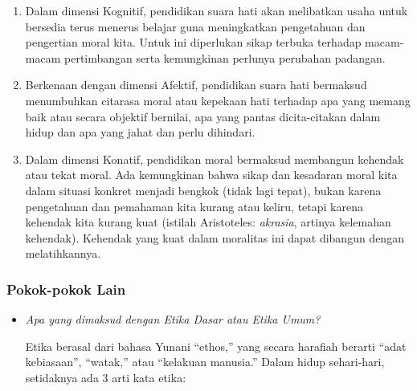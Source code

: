 \documentclass[10pt,a4paper]{article}
\def\tightlist{}
\begin{document}
\begin{multicols}{2}
\begin{enumerate}
\def\labelenumi{\arabic{enumi}.}
\tightlist
\item
  Dalam dimensi Kognitif, pendidikan suara hati akan melibatkan usaha
  untuk bersedia terus menerus belajar guna meningkatkan pengetahuan dan
  pengertian moral kita. Untuk ini diperlukan sikap terbuka terhadap
  macam-macam pertimbangan serta kemungkinan perlunya perubahan
  padangan.
\item
  Berkenaan dengan dimensi Afektif, pendidikan suara hati bermaksud
  menumbuhkan citarasa moral atau kepekaan hati terhadap apa yang memang
  baik atau secara objektif bernilai, apa yang pantas dicita-citakan
  dalam hidup dan apa yang jahat dan perlu dihindari.
\item
  Dalam dimensi Konatif, pendidikan moral bermaksud membangun kehendak
  atau tekat moral. Ada kemungkinan bahwa sikap dan kesadaran moral kita
  dalam situasi konkret menjadi bengkok (tidak lagi tepat), bukan karena
  pengetahuan dan pemahaman kita kurang atau keliru, tetapi karena
  kehendak kita kurang kuat (istilah Aristoteles: \emph{akrasia},
  artinya kelemahan kehendak). Kehendak yang kuat dalam moralitas ini
  dapat dibangun dengan melatihkannya.
\end{enumerate}

\hypertarget{pokok-pokok-lain-7}{%
\subsubsection{Pokok-pokok Lain}\label{pokok-pokok-lain-7}}

\begin{itemize}
\item
  \emph{Apa yang dimaksud dengan Etika Dasar atau Etika Umum?}

  Etika berasal dari bahasa Yunani ``ethos,'' yang secara harafiah
  berarti ``adat kebiasaan'', ``watak,'' atau ``kelakuan manusia.''
  Dalam hidup sehari-hari, setidaknya ada 3 arti kata etika:


\end{itemize}
\end{multicols}
\end{document}

